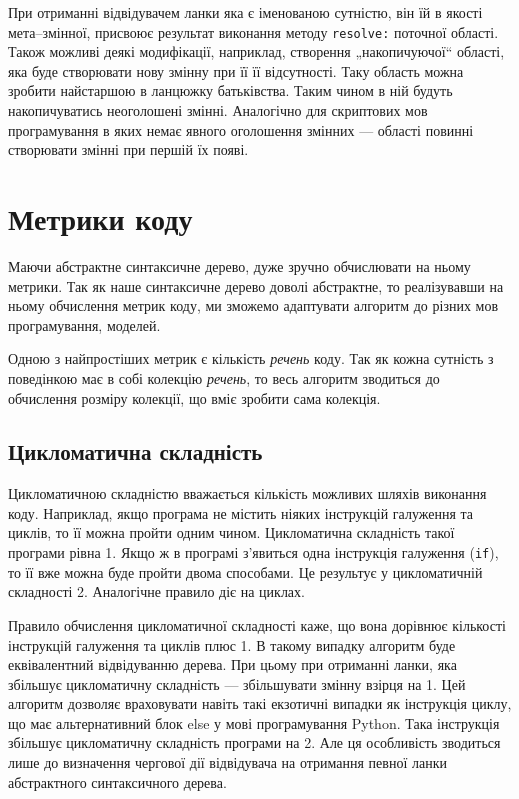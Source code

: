\documentclass[12pt,a4paper]{article}
\begin{document}
При отриманні відвідувачем ланки яка є іменованою сутністю, він їй в якості мета--змінної, присвоює результат виконання методу \lstinline$resolve:$ поточної області. Також можливі деякі модифікації, наприклад, створення „накопичуючої“ області, яка буде створювати нову змінну при її її відсутності. Таку область можна зробити найстаршою в ланцюжку батьківства. Таким чином в ній будуть накопичуватись неоголошені змінні. Аналогічно для скриптових мов програмування в яких немає явного оголошення змінних --- області повинні створювати змінні при першій їх появі.
\clearpage

\section{Метрики коду}
Маючи абстрактне синтаксичне дерево, дуже зручно обчислювати на ньому метрики. Так як наше синтаксичне дерево доволі абстрактне, то реалізувавши на ньому обчислення метрик коду, ми зможемо адаптувати алгоритм до різних мов програмування, моделей. 

Одною з найпростіших метрик є кількість \emph{речень} коду. Так як кожна сутність з поведінкою має в собі колекцію \emph{речень}, то весь алгоритм зводиться до обчислення розміру колекції, що вміє зробити сама колекція.

\subsection{Цикломатична складність}
Цикломатичною складністю вважається кількість можливих шляхів виконання коду. Наприклад, якщо програма не містить ніяких інструкцій галуження та циклів, то її можна пройти одним чином. Цикломатична складність такої програми рівна 1. Якщо ж в програмі з'явиться одна інструкція галуження (\lstinline$if$), то її вже можна буде пройти двома способами. Це результує у цикломатичній складності 2. Аналогічне правило діє на циклах. 

Правило обчислення цикломатичної складності каже, що вона дорівнює кількості інструкцій галуження та циклів плюс 1. В такому випадку алгоритм буде еквівалентний відвідуванню дерева. При цьому при отриманні ланки, яка збільшує цикломатичну складність --- збільшувати змінну взірця на 1. Цей алгоритм дозволяє враховувати навіть такі екзотичні випадки як інструкція циклу, що має альтернативний блок else у мові програмування Python. Така інструкція збільшує цикломатичну складність програми на 2. Але ця особливість зводиться лише до визначення чергової дії відвідувача на отримання певної ланки абстрактного синтаксичного дерева.
\end{document}
